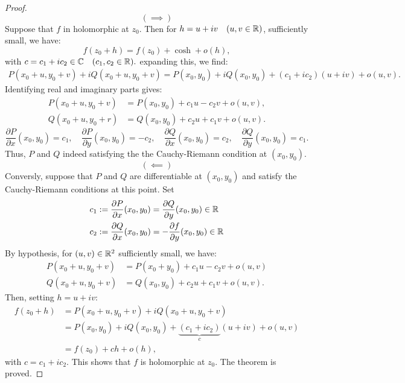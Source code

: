 \begin{proof}
  \[
    ( \implies ) 
  \]
  Suppose that $f $ in holomorphic at $z_0 $. Then for $h = u + iv \quad (u, v \in  \mathbb{R} )$, sufficiently small, we have:
  \[
  f(z_0 + h)  = f(z_0)  +  \cosh  + o(h),
  \]
  with $c = c_1 + ic_2 \in  \mathbb{C} \quad (c_1, c_2 \in  \mathbb{R}).$ expanding this, we find:
  \begin{align*}
  P(x_0 + u, y_0 + v)  + i Q(x_0 + u, y_0 + v)  = 
  P(x_0, y_0) + i Q(x_0, y_0) + (c_1 + i c_2)(u + iv)  + o (u, v).
  \end{align*}
  Identifying real and imaginary parts gives:
  \begin{align*}
    P(x_0 + u, y_0 + v)  &= 
  P(x_0, y_0)  + c_1 u - c_2 v + o(u, v),  \\
    Q(x_0 + u, y_0 + r) &= Q(x_0, y_0)  + 
    c_2 u + c_1 v + o(u, v).
  \end{align*}
  \[
  \frac{\partial P}{\partial x} (x_0, y_0)  = c_1, \quad 
  \frac{\partial P}{\partial y} (x_0, y_0)  = -c_2, \quad 
  \frac{\partial Q}{\partial x} (x_0, y_0)  = c_2, 
  \quad 
  \frac{\partial Q}{\partial y} (x_0, y_0) = c_1.
  \]
  Thus, $P $ and $Q $ indeed satisfying the 
  the Cauchy-Riemann condition at $(x_0, y_0).$ 
  \[
    ( \impliedby ) 
  \]
  Conversly, suppose that $P $ and $Q $  are differentiable at $(x_0, y_0)$  
  and satisfy the Cauchy-Riemann conditions at this point. Set
  \begin{align*}
    c_1 &:= \frac{\partial P}{\partial x} (x_0, y_0)  = 
    \frac{\partial Q}{\partial y} (x_0, y_0) \in  \mathbb{R} \\
    c_2 &:= \frac{\partial Q}{\partial x} (x_0, y_0)  = 
    - \frac{\partial f}{\partial y} (x_0, y_0)  \in  \mathbb{R} 
  \end{align*}
  By hypothesis, for $(u, v) \in   \mathbb{R} ^2  $ sufficiently small, we have: 
  \begin{align*}
    P(x_0 + u, y_0 + v)  &= 
    P(x_0 + y_0)  + c_1 u - c_2 v + o (u, v) \\
    Q(x_0 + u, y_0 + v)  &= 
    Q(x_0, y_0)  + c_2 u + c_1 v + o(u, v) .
  \end{align*}
  Then, setting $h = u + iv $:
  \begin{align*}
    f(z_0 + h) &= P(x_0 + u, y_0 + v)  + iQ(x_0 + u , y_0 + v)  \\
               &= P(x_0 , y_0)  + iQ(x_0, y_0)  + \underbrace{(c_1 + ic_2)
               }_{c} (u + iv) + o(u, v)  \\
               &=  f(z_0) + ch  + o(h),
  \end{align*}
  with $c = c_1 + ic_2 $. This shows that $f $ is holomorphic at $z_0 $. The theorem is proved.
\end{proof}
